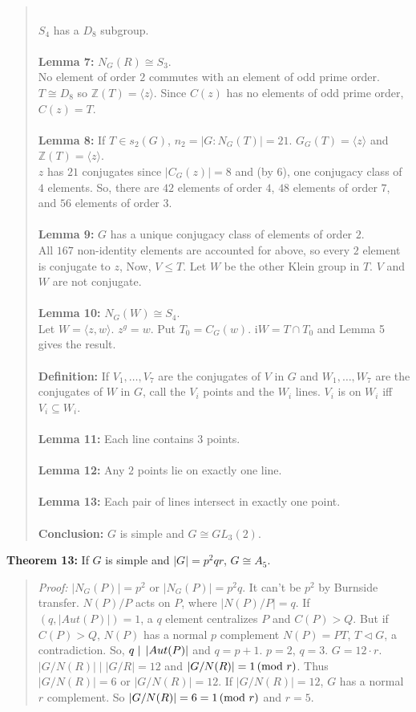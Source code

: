 \begin{quote}
\\
$S_4$ has a $D_8$ subgroup.
\\
\\
{\bf Lemma 7:} $N_G(R) \cong S_3$.
\\
No element of order $2$ commutes with an element of odd prime order. $T \cong D_8$ so
${\mathbb Z}(T)= \langle z \rangle$.  Since $C(z)$ has no elements of odd prime order,
$C(z)=T$.
\\
\\
{\bf Lemma 8:} If $T \in s_2(G)$, $n_2= |G:N_G(T)| = 21$. $G_G(T) = \langle z \rangle$ and ${\mathbb Z}(T) = \langle z \rangle$.
\\
$z$ has $21$ conjugates since $|C_G(z)|=8$ and (by 6), one conjugacy class of $4$ elements.  So,
there are $42$ elements of order $4$, $48$ elements of order $7$, and $56$ elements of order $3$.
\\
\\
{\bf Lemma 9:} $G$ has a unique conjugacy class of elements of order $2$.
\\
All $167$ non-identity elements are accounted for above, so every $2$ element is conjugate to $z$,
Now, $V \leq T$.  Let $W$ be the other Klein group in $T$.  $V$ and $W$ are not conjugate.
\\
\\
{\bf Lemma 10:} $N_G(W) \cong S_4$.
\\
Let $W = \langle z, w \rangle$.  $z^g=w$.  Put $T_0 = C_G(w)$.  i$W = T \cap T_0$ and
Lemma 5 gives the result.
\\
\\
{\bf Definition:} If 
$V_1, \ldots , V_7$ are the conjugates of $V$ in $G$ and
$W_1, \ldots , W_7$ are the conjugates of $W$ in $G$, call the $V_i$ points and the $W_i$ lines.
$V_i$ is on $W_i$ iff $V_i \subseteq W_i$.
\\
\\
{\bf Lemma 11:} Each line contains $3$ points.
\\
\\
{\bf Lemma 12:} Any $2$ points lie on exactly one line.
\\
\\
{\bf Lemma 13:} Each pair of lines intersect in exactly one point.
\\
\\
{\bf Conclusion:} $G$ is simple and $G \cong GL_3(2)$.
\end{quote}
{\bf Theorem 13:} If $G$ is simple and $|G|=p^2qr$, $G \cong A_5$.
\begin{quote}
\emph{Proof:}
$|N_G(P)| = p^2$ or $|N_G(P)| = p^2 q$.  It can't be $p^2$ by Burnside transfer.
$N(P)/P$ acts on $P$, where $|N(P)/P| =q$. If $(q, |Aut(P)|)=1$, a $q$
element centralizes $P$ and $C(P)>Q$.  But if $C(P)>Q$, $N(P)$ has a normal
$p$ complement $N(P)= PT$, $T \lhd G$, a contradiction.  So,
$q \mid \thinspace |Aut(P)|$ and $q=p+1$.  $p=2$, $q=3$.
$G=12 \cdot r$.  $|G/N(R)| \mid |G/R|= 12$ and $|G/N(R)| = 1 \thinspace \textnormal{(mod } r \textnormal{)}$.
Thus $|G/N(R)|= 6$ or $|G/N(R)|= 12$.
If $|G/N(R)|=12$, $G$ has a normal $r$ complement.  So
$|G/N(R)|= 6 = 1 \thinspace \textnormal{(mod } r \textnormal{)}$ and $r = 5$.
\end{quote}
